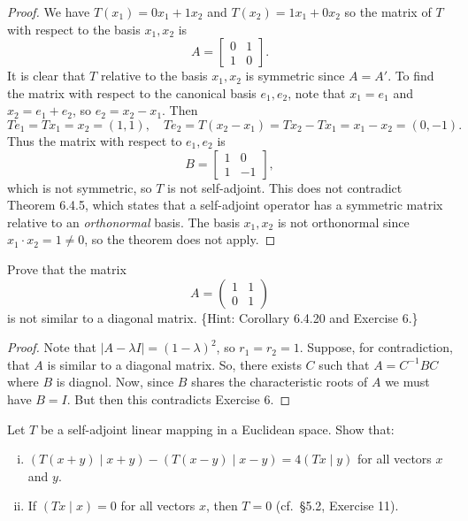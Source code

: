 \begin{proof}
    We have 
    $T(x_1) = 0 x_1 + 1 x_2$ and 
    $T(x_2) = 1 x_1 + 0 x_2$ so the matrix of $T$ with respect to 
    the basis $x_1, x_2$ is 
    \[
    A = \begin{bmatrix}
        0 & 1 \\
        1 & 0
    \end{bmatrix}.
    \]
    It is clear that $T$ relative to the basis $x_1, x_2$ is symmetric since $A = A'$.
    To find the matrix with respect to the canonical basis $e_1, e_2$, note that
    $x_1 = e_1$ and $x_2 = e_1 + e_2$, so $e_2 = x_2 - x_1$. Then
    \[
    Te_1 = Tx_1 = x_2 = (1,1), \quad Te_2 = T(x_2 - x_1) = Tx_2 - Tx_1 = x_1 - x_2 = (0,-1).
    \]
    Thus the matrix with respect to $e_1, e_2$ is 
    \[
    B = \begin{bmatrix}
        1 & 0 \\
        1 & -1
    \end{bmatrix},
    \]
    which is not symmetric, so $T$ is not self-adjoint. This does not contradict
    Theorem 6.4.5, which states that a self-adjoint operator has a symmetric matrix
    relative to an \emph{orthonormal} basis. The basis $x_1, x_2$ is not orthonormal
    since $x_1 \cdot x_2 = 1 \neq 0$, so the theorem does not apply.
\end{proof}

\begin{tcolorbox}[title=Problem 10, breakable]
Prove that the matrix
\[
A = \begin{pmatrix}1 & 1\\0 & 1\end{pmatrix}
\]
is not similar to a diagonal matrix. \{Hint: Corollary 6.4.20 and Exercise 6.\}
\end{tcolorbox}

\begin{proof}
    Note that $|A - \lambda I| = (1-\lambda)^2$, so $r_1 = r_2 = 1$.
    Suppose, for contradiction, that $A$ is similar to a diagonal matrix.
    So, there exists $C$ such that $A = C^{-1} B C$ where $B$ is diagnol.
    Now, since $B$ shares the characteristic roots of $A$ we must have $B = I$.
    But then this contradicts Exercise 6.
\end{proof}


\begin{tcolorbox}[title=Problem 11, breakable]
Let $T$ be a self-adjoint linear mapping in a Euclidean space. Show that:
\begin{enumerate}[(i)]
    \item $(T(x+y)\mid x+y) - (T(x-y)\mid x-y) = 4(Tx\mid y)$ for all vectors $x$ and $y$.
    \item If $(Tx\mid x) = 0$ for all vectors $x$, then $T = 0$ (cf.\ \S5.2, Exercise 11).
\end{enumerate}
\end{tcolorbox}

